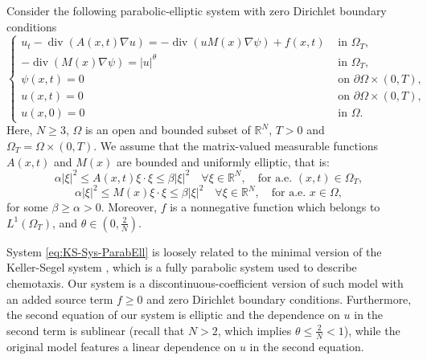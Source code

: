 \documentclass{amsart}
\numberwithin{equation}{section}
\def\elleomT#1{L^{#1}(\Omega_T)}
\def\R{\mathbb{R}}
\newcommand{\abs}[1]{\left|#1\right|}
\begin{document}
Consider the following parabolic-elliptic system with zero Dirichlet boundary conditions
\begin{equation}\label{eq:KS-Sys-ParabEll}
    \left\{\begin{array}{cc}
    u_t-\operatorname{div}(A(x, t) \nabla u)=-\operatorname{div}(u M(x) \nabla \psi)+f(x,t) & \text { in } \Omega_T, \\
    -\operatorname{div}(M(x) \nabla \psi)=|u|^\theta & \text { in } \Omega_T, \\
    \psi(x, t)=0 & \text { on } \partial\Omega\times(0, T), \\
    u(x, t)=0 & \text { on } \partial\Omega\times(0, T), \\
    u(x, 0)=0 & \text { in } \Omega.
    \end{array}\right.
\end{equation}
Here, $N\geq3$, $\Omega$ is an open and bounded subset of $\R^N$, $T>0$ and $\Omega_T=\Omega\times(0,T)$. We assume that the matrix-valued measurable functions $A(x,t)$ and $M(x)$ are bounded and uniformly elliptic, that is:
$$\alpha\abs{\xi}^2\leq A(x,t)\xi\cdot\xi\leq \beta\abs{\xi}^2 \quad\forall \xi\in\R^N, \quad\text{for a.e. } (x,t)\in\Omega_T,$$
$$\alpha\abs{\xi}^2\leq M(x)\xi\cdot\xi\leq \beta\abs{\xi}^2 \quad\forall \xi\in\R^N, \quad\text{for a.e. } x\in\Omega,$$
for some $\beta\geq\alpha>0$. Moreover, $f$ is a nonnegative function which belongs to $\elleomT1$, and $\theta\in(0,\frac2N)$.

System \eqref{eq:KS-Sys-ParabEll} is loosely related to the minimal version of the Keller-Segel system \cite{UsersGuideChemo}, which is a fully parabolic system used to describe chemotaxis. Our system is a discontinuous-coefficient version of such model with an added source term $f\geq 0$ and zero Dirichlet boundary conditions. Furthermore, the second equation of our system is elliptic and the dependence on $u$ in the second term is sublinear (recall that $N>2$, which implies $\theta\leq\frac2N<1$), while the original model features a linear dependence on $u$ in the second equation.
\end{document}
